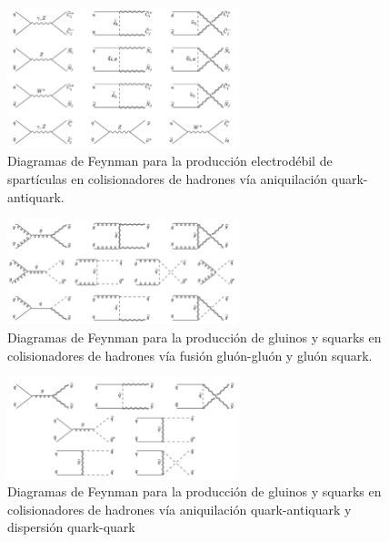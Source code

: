 \begin{figure}[!htbp]
  \centering \includegraphics[width=0.6\textwidth]{figures/figure_101}
  \caption{Diagramas de Feynman para la producción electrodébil de spartículas
    en colisionadores de hadrones vía aniquilación quark-antiquark.}
  \label{fig:ewkprod}
\end{figure}

\begin{figure}[!htbp]
  \centering \includegraphics[width=0.6\textwidth]{figures/figure_102}
  \caption{Diagramas de Feynman para la producción de gluinos y squarks en
    colisionadores de hadrones vía fusión gluón-gluón y gluón squark.}
  \label{fig:strongprod1}
\end{figure}

\begin{figure}[!htbp]
  \centering \includegraphics[width=0.6\textwidth]{figures/figure_103}
  \caption{Diagramas de Feynman para la producción de gluinos y squarks en
    colisionadores de hadrones vía aniquilación quark-antiquark y dispersión
    quark-quark}
  \label{fig:strongprod2}
\end{figure}


